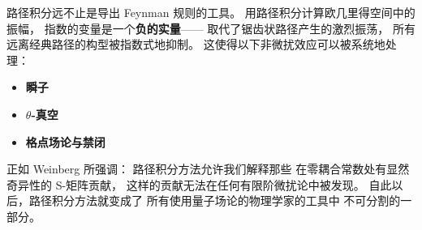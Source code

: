 \medskip\noindent
路径积分远不止是导出 Feynman 规则的工具。
用路径积分计算欧几里得空间中的振幅，
指数的变量是一个\textbf{负的实量}——
取代了锯齿状路径产生的激烈振荡，
所有远离经典路径的构型被指数式地抑制。
这使得以下非微扰效应可以被系统地处理：

\begin{itemize}
  \item \textbf{瞬子}
  \item \textbf{$\theta$-真空}
  \item \textbf{格点场论与禁闭}
\end{itemize}

\noindent
正如 Weinberg 所强调：
路径积分方法允许我们解释那些
在零耦合常数处有显然奇异性的 S-矩阵贡献，
这样的贡献无法在任何有限阶微扰论中被发现。
自此以后，路径积分方法就变成了
所有使用量子场论的物理学家的工具中
不可分割的一部分。



